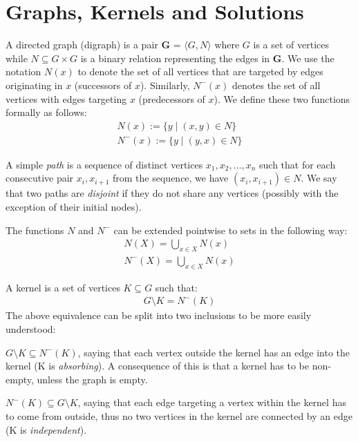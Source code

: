 \section{Graphs, Kernels and Solutions}
\label{sec:Graphs, Kernels and Solution}
A directed graph (digraph) is a pair \textbf{G} = $\langle G,N \rangle$ where $G$ is a set of vertices while $N \subseteq G \times G$ is a binary relation representing the edges in \textbf{G}.
We use the notation $N(x)$ to denote the set of all vertices that are targeted by edges originating in $x$ (successors of $x$).
Similarly, $N^-(x)$ denotes the set of all vertices with edges targeting $x$ (predecessors of $x$).
We define these two functions formally as follows:
\begin{align}
  N(x) := \{y \;|\; (x,y) \in N\}\\
  N^-(x) := \{ y \;|\; (y,x) \in N \}
\end{align}

A simple \textit{path} is a sequence of distinct vertices $x_1,x_2,\dots,x_n$ such that for each consecutive pair $x_i,x_{i+1}$ from the sequence, we have $(x_i, x_{i+1}) \in N$.
We say that two paths are \textit{disjoint} if they do not share any vertices (possibly with the exception of their initial nodes).

The functions $N$ and $N^-$ can be extended pointwise to sets in the following way:
\begin{align}
  N(X) = \bigcup_{x \in X} N(x)\\
  N^-(X) = \bigcup_{x \in X} N(x)
\end{align}

A kernel is a set of vertices $K \subseteq G$ such that:
\begin{align}
  G \setminus K = N^-(K)
\end{align}
The above equivalence can be split into two inclusions to be more easily understood:

$G \setminus K \subseteq N^-(K)$, saying that each vertex outside the kernel has an edge into the kernel (K is \textit{absorbing}).
A consequence of this is that a kernel has to be non-empty, unless the graph is empty.

$N^-(K) \subseteq G \setminus K$, saying that each edge targeting a vertex within the kernel has to come from outside, thus no two vertices in the kernel are connected by an edge (K is \textit{independent}).

